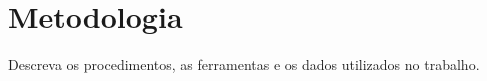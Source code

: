 \section{Metodologia}

Descreva os procedimentos, as ferramentas e os dados utilizados no trabalho.
